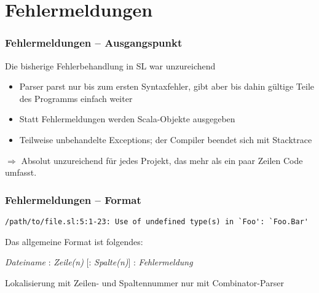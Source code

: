 \section{Fehlermeldungen}

\begin{frame}
\frametitle{Fehlermeldungen -- Ausgangspunkt}
Die bisherige Fehlerbehandlung in SL war unzureichend
\begin{itemize}
\item Parser parst nur bis zum ersten Syntaxfehler, gibt aber bis
  dahin gültige Teile des Programms einfach weiter
\item Statt Fehlermeldungen werden Scala-Objekte ausgegeben
\item Teilweise unbehandelte Exceptions; der Compiler beendet sich
  mit Stacktrace
\end{itemize}
$\Rightarrow$ Absolut unzureichend für jedes Projekt, das mehr als 
ein paar Zeilen Code umfasst.
\end{frame}

\begin{frame}[containsverbatim=true]
\frametitle{Fehlermeldungen -- Format}
\begin{lstlisting}
/path/to/file.sl:5:1-23: Use of undefined type(s) in `Foo': `Foo.Bar'
\end{lstlisting}
Das allgemeine Format ist folgendes:
\begin{center}
\emph{Dateiname} : \emph{Zeile(n)} [: \emph{Spalte(n)}] : \emph{Fehlermeldung}
\end{center}
Lokalisierung mit Zeilen- und Spaltennummer nur mit Combinator-Parser
\end{frame}

